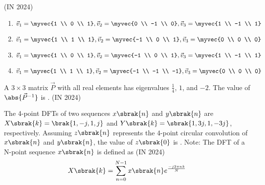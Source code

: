     \hfill{(IN 2024)}
    \begin{multicols}{2}
    \begin{enumerate}
        \item 
    $    \vec{v}_1 = \myvec{1 \\ 0 \\ 1}, \vec{v}_2 = \myvec{0 \\ -1 \\ 0}, \vec{v}_3 = \myvec{1 \\ -1 \\ 1}
    $
        \item 
        $
        \vec{v}_1 = \myvec{1 \\ 1 \\ 1}, \vec{v}_2 = \myvec{-1 \\ 0 \\ 1}, \vec{v}_3 = \myvec{0 \\ 0 \\ 0}
        $
        \item
        $
        \vec{v}_1 = \myvec{1 \\ 0 \\ 1}, \vec{v}_2 = \myvec{-1 \\ 0 \\ 1}, \vec{v}_3 = \myvec{1 \\ -1 \\ 1}
        $
        \item
        $
        \vec{v}_1 = \myvec{1 \\ 1 \\ 1}, \vec{v}_2 = \myvec{-1 \\ -1 \\ -1}, \vec{v}_3 = \myvec{0 \\ 0 \\ 0}
        $
    \end{enumerate}
\end{multicols}
    \item A $3 \times 3$ matrix $\vec{P}$ with all real elements has eigenvalues $\frac{1}{4}$, $1$, and $-2$. The value of $\abs{\vec{P}^{-1}}$ is \underline{\hspace{1cm}}. 
    \hfill{(IN 2024)}
    \item The 4-point DFTs of two sequences $x\sbrak{n}$ and $y\sbrak{n}$ are $X\sbrak{k} = \brak{1, -j, 1, j}$ and $Y\sbrak{k} = \sbrak{1, 3j, 1, -3j}$, respectively. Assuming $z\sbrak{n}$ represents the 4-point circular convolution of $x\sbrak{n}$ and $y\sbrak{n}$, the value of $z\sbrak{0}$ is \underline{\hspace{1cm}}. 
    Note: The DFT of a N-point sequence $x\sbrak{n}$ is defined as
    \hfill{(IN 2024)}
    \begin{align*}
        X\sbrak{k} = \sum_{n=0}^{N-1} x\sbrak{n} e^{\frac{-j2\pi nk}{N}}
    \end{align*}
